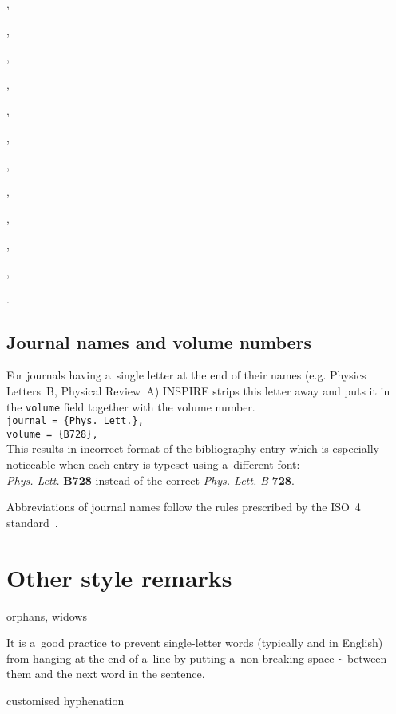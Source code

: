 \documentclass[12pt,a4paper]{article}
\begin{document}
,

,

,

,

,

,

,

,

,

,

,

.

\subsection{Journal names and volume numbers}

For journals having a~single letter at the end of their names (e.g. Physics Letters~B, Physical Review~A) INSPIRE strips this letter away and puts it in the \verb_volume_ field together with the volume number.\\
\verb_journal = {Phys. Lett.},_ \\
\verb_volume = {B728},_\\
This results in incorrect format of the bibliography entry which is especially noticeable when each entry is typeset using a~different font:\\
\textit{Phys. Lett.} \textbf{B728} instead of the correct \textit{Phys. Lett. B} \textbf{728}.

Abbreviations of journal names follow the rules prescribed by the ISO~4 standard~\cite{iso-4}.


\section{Other style remarks}

orphans, widows

It is a~good practice to prevent single-letter words (typically  and  in English) from hanging at the end of a~line by putting a~non-breaking space \verb!~! between them and the next word in the sentence.

customised hyphenation
\end{document}
